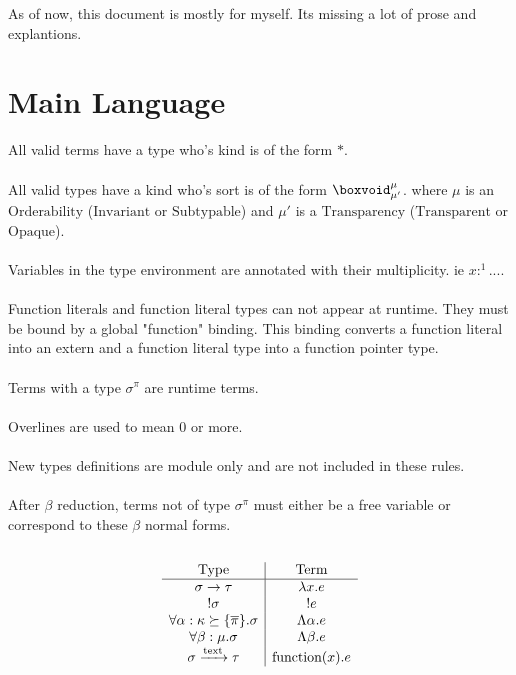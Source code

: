 \documentclass {article}
\begin{document}
As of now, this document is mostly for myself. Its missing a lot of prose and explantions. \\

\tableofcontents


\section{Main Language}
All valid terms have a type who's kind is of the form $ * $. \\
\\
All valid types have a kind who's sort is of the form $ \boxvoid^\mu_{\mu'} $.
where $ \mu $ is an $ \text{Orderability} $ ($\text{Invariant} $ or $ \text{Subtypable}$)
and $ \mu' $ is a $ \text{Transparency}$ ($\text{Transparent}$ or $\text{Opaque}$). \\
\\
Variables in the type environment are annotated with their multiplicity. ie $ x :^1 ... $. \\
\\
Function literals and function literal types can not appear at runtime. They must be bound by a global "function" binding.
This binding converts a function literal into an extern and a function literal type into a function pointer type. \\
\\
Terms with a type $ \sigma^\pi $ are runtime terms. \\
\\
Overlines are used to mean 0 or more. \\
\\
New types definitions are module only and are not included in these rules. \\
\\
After $ \beta $ reduction, terms not of type $ \sigma^\pi $ must either be a free variable or correspond to these $ \beta $ normal forms. \\
\\
\begin{gather*}
\begin{array}{c | c}
\text{Type} & \text{Term} \\
\hline
\sigma \to \tau & \lambda x. e \\
!\sigma & !e \\
\forall \alpha : \kappa \succeq \{ \overline \pi \}. \sigma & \Lambda \alpha. e  \\
\forall \beta : \mu. \sigma & \Lambda \beta. e \\
\sigma \xrightarrow{\text{text}} \tau & \text{function}(x). e \\
\end{array}
\\
\end{gather*}
\end{document}
